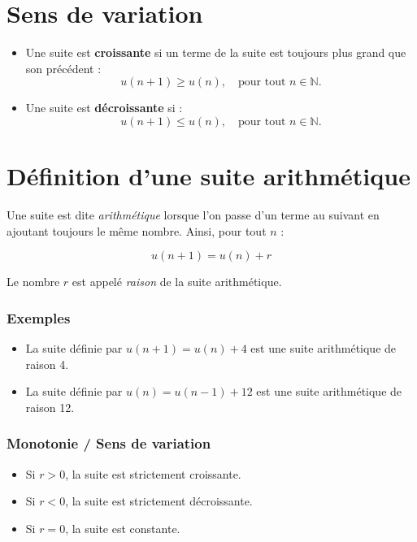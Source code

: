 \documentclass[a4paper,12pt]{article}
\begin{document}
\section*{Sens de variation}

\begin{itemize}
\item Une suite est \textbf{croissante} si un terme de la suite est toujours plus grand que son précédent : 
\[
u(n + 1) \geq u(n), \quad \text{pour tout } n \in \mathbb{N}.
\]

\item Une suite est \textbf{décroissante} si : 
\[
u(n + 1) \leq u(n), \quad \text{pour tout } n \in \mathbb{N}.
\]
\end{itemize}

\section*{Définition d'une suite arithmétique}

Une suite est dite \textit{arithmétique} lorsque l'on passe d'un terme au suivant en ajoutant toujours le même nombre. Ainsi, pour tout $n$ :

\[
u(n + 1) = u(n) + r
\]

Le nombre $r$ est appelé \textit{raison} de la suite arithmétique.

\subsubsection*{Exemples}

\begin{itemize}[noitemsep]
    \item La suite définie par $u(n + 1) = u(n) + 4$ est une suite arithmétique de raison 4.
    \item La suite définie par $u(n) = u(n - 1) + 12$ est une suite arithmétique de raison 12.
\end{itemize}

\subsubsection*{Monotonie / Sens de variation}

\begin{itemize}[noitemsep]
    \item Si $r > 0$, la suite est strictement croissante.
    \item Si $r < 0$, la suite est strictement décroissante.
    \item Si $r = 0$, la suite est constante.
\end{itemize}
\end{document}
